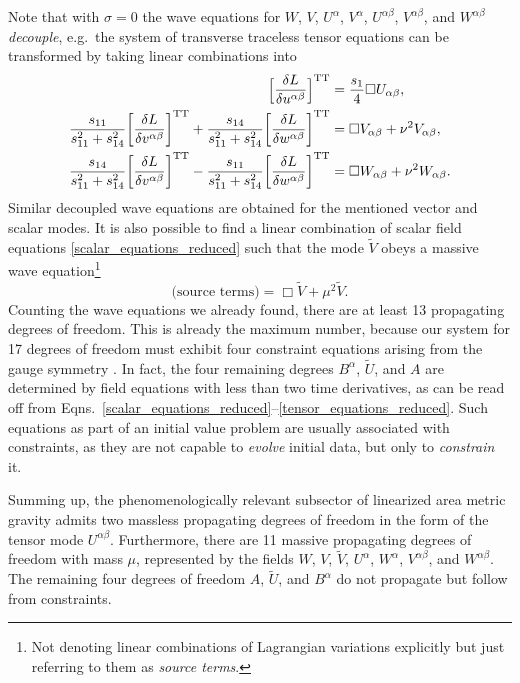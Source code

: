 Note that with $\sigma=0$ the wave equations for $W$, $V$, $U^\alpha$, $V^\alpha$, $U^{\alpha\beta}$, $V^{\alpha\beta}$, and $W^{\alpha\beta}$ \emph{decouple}, e.g.~the system of transverse traceless tensor equations can be transformed by taking linear combinations into
\begingroup\allowdisplaybreaks
\begin{align}\footnotesize
  \bigg\lbrack\frac{\delta L}{\delta u^{\alpha\beta}}\bigg\rbrack^\text{TT} = {} & \frac{s_1}{4} \Box U_{\alpha\beta}, \nonumber \\
  \frac{s_{11}}{s_{11}^2 + s_{14}^2} \bigg\lbrack\frac{\delta L}{\delta v^{\alpha\beta}}\bigg\rbrack^\text{TT} + \frac{s_{14}}{s_{11}^2 + s_{14}^2} \bigg\lbrack\frac{\delta L}{\delta w^{\alpha\beta}}\bigg\rbrack^\text{TT} = {} & \Box V_{\alpha\beta} + \nu^2 V_{\alpha\beta}, \label{tensor_equations_decoupled} \\
  \frac{s_{14}}{s_{11}^2 + s_{14}^2} \bigg\lbrack\frac{\delta L}{\delta v^{\alpha\beta}}\bigg\rbrack^\text{TT} - \frac{s_{11}}{s_{11}^2 + s_{14}^2} \bigg\lbrack\frac{\delta L}{\delta w^{\alpha\beta}}\bigg\rbrack^\text{TT} = {} & \Box W_{\alpha\beta} + \nu^2 W_{\alpha\beta}. \nonumber
\end{align}
\endgroup
Similar decoupled wave equations are obtained for the mentioned vector and scalar modes. It is also possible to find a linear combination of scalar field equations \eqref{scalar_equations_reduced} such that the mode $\tilde V$ obeys a massive wave equation\footnote{Not denoting linear combinations of Lagrangian variations explicitly but just referring to them as \emph{source terms}.}
\begin{equation}\label{trace_massive_wave}
  \text{(source terms)} = \Box \tilde V + \mu^2 \tilde V.
\end{equation}
Counting the wave equations we already found, there are at least 13 propagating degrees of freedom. This is already the maximum number, because our system for 17 degrees of freedom must exhibit four constraint equations arising from the gauge symmetry \cite{}. In fact, the four remaining degrees $B^\alpha$, $\tilde U$, and $A$ are determined by field equations with less than two time derivatives, as can be read off from Eqns.~\eqref{scalar_equations_reduced}--\eqref{tensor_equations_reduced}. Such equations as part of an initial value problem are usually associated with constraints, as they are not capable to \emph{evolve} initial data, but only to \emph{constrain} it. \cite{}

Summing up, the phenomenologically relevant subsector of linearized area metric gravity admits two massless propagating degrees of freedom in the form of the tensor mode $U^{\alpha\beta}$. Furthermore, there are 11 massive propagating degrees of freedom with mass $\mu$, represented by the fields $W$, $V$, $\tilde V$, $U^\alpha$, $W^\alpha$, $V^{\alpha\beta}$, and $W^{\alpha\beta}$. The remaining four degrees of freedom $A$, $\tilde U$, and $B^\alpha$ do not propagate but follow from constraints.

